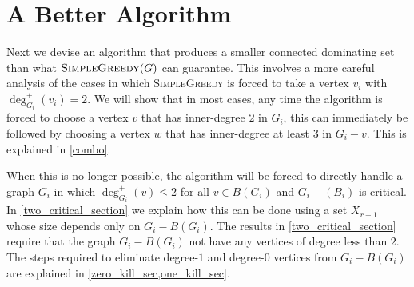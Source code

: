 \documentclass{article}
\theoremstyle{definition}
\begin{document}
%
%

\section{A Better Algorithm}
\label{full_result}

Next we devise an algorithm that produces a smaller connected dominating set than what $\textsc{SimpleGreedy}(G)$ can guarantee.  This involves a more careful analysis of the cases in which \textsc{SimpleGreedy} is forced to take a vertex $v_i$ with $\deg^+_{G_i}(v_i)=2$.  We will show that in most cases, any time the algorithm is forced to choose a vertex $v$ that has inner-degree $2$ in $G_i$, this can immediately be followed by choosing a vertex $w$ that has inner-degree at least $3$ in $G_i-v$.  This is explained in \cref{combo}.

When this is no longer possible, the algorithm will be forced to directly handle a graph $G_i$ in which $\deg^+_{G_i}(v)\le 2$ for all $v\in B(G_i)$ and $G_i-(B_i)$ is critical.  In \cref{two_critical_section} we explain how this can be done using a set $X_{r-1}$ whose size depends only on $G_i-B(G_i)$.  The results in \cref{two_critical_section} require that the graph $G_i-B(G_i)$ not have any vertices of degree less than $2$.  The steps required to eliminate degree-$1$ and degree-$0$ vertices from $G_i-B(G_i)$ are explained in \cref{zero_kill_sec,one_kill_sec}.
\end{document}
